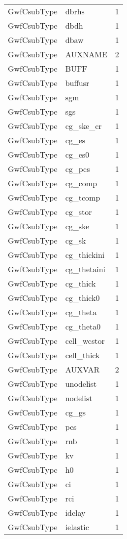 \begin{longtable}{p{6cm} p{4cm} p{2cm} }
GwfCsubType & dbrhs & 1 \\ 
GwfCsubType & dbdh & 1 \\ 
GwfCsubType & dbaw & 1 \\ 
GwfCsubType & AUXNAME & 2 \\ 
GwfCsubType &  BUFF & 1 \\ 
GwfCsubType &  buffusr & 1 \\ 
GwfCsubType &  sgm & 1 \\ 
GwfCsubType &  sgs & 1 \\ 
GwfCsubType &  cg\_ske\_cr & 1 \\ 
GwfCsubType &  cg\_es & 1 \\ 
GwfCsubType &  cg\_es0 & 1 \\ 
GwfCsubType &  cg\_pcs & 1 \\ 
GwfCsubType &  cg\_comp & 1 \\ 
GwfCsubType &  cg\_tcomp & 1 \\ 
GwfCsubType &  cg\_stor & 1 \\ 
GwfCsubType &  cg\_ske & 1 \\ 
GwfCsubType &  cg\_sk & 1 \\ 
GwfCsubType &  cg\_thickini & 1 \\ 
GwfCsubType &  cg\_thetaini & 1 \\ 
GwfCsubType &  cg\_thick & 1 \\ 
GwfCsubType &  cg\_thick0 & 1 \\ 
GwfCsubType &  cg\_theta & 1 \\ 
GwfCsubType &  cg\_theta0 & 1 \\ 
GwfCsubType &  cell\_wcstor & 1 \\ 
GwfCsubType &  cell\_thick & 1 \\ 
GwfCsubType &  AUXVAR & 2 \\ 
GwfCsubType &  unodelist & 1 \\ 
GwfCsubType &  nodelist & 1 \\ 
GwfCsubType &  cg\_gs & 1 \\ 
GwfCsubType &  pcs & 1 \\ 
GwfCsubType &  rnb & 1 \\ 
GwfCsubType &  kv & 1 \\ 
GwfCsubType &  h0 & 1 \\ 
GwfCsubType &  ci & 1 \\ 
GwfCsubType &  rci & 1 \\ 
GwfCsubType &  idelay & 1 \\ 
GwfCsubType &  ielastic & 1 \\ 

\end{longtable}
